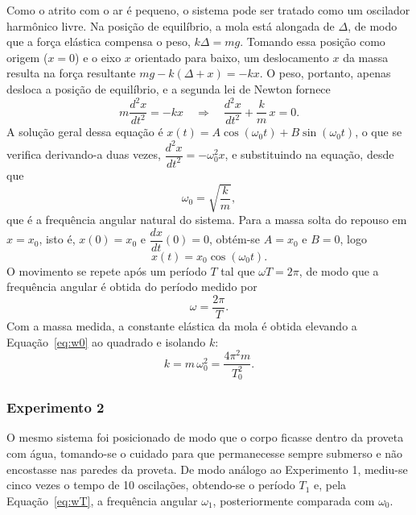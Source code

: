 \documentclass[12pt, a4paper]{article}
\begin{document}
Como o atrito com o ar é pequeno, o sistema pode ser tratado como um oscilador harmônico livre. Na posição de equilíbrio, a mola está alongada de $\Delta$, de modo que a força elástica compensa o peso, $k\Delta=mg$. Tomando essa posição como origem ($x=0$) e o eixo $x$ orientado para baixo, um deslocamento $x$ da massa resulta na força resultante $mg-k(\Delta+x)=-kx$. O peso, portanto, apenas desloca a posição de equilíbrio, e a segunda lei de Newton fornece
\[
m\frac{d^2x}{dt^2}=-kx
\quad\Longrightarrow\quad
\frac{d^2x}{dt^2}+\frac{k}{m}\,x=0.
\]
A solução geral dessa equação é $x(t)=A\cos(\omega_0 t)+B\sin(\omega_0 t)$, o que se verifica derivando-a duas vezes, $\dfrac{d^2x}{dt^2}=-\omega_0^2x$, e substituindo na equação, desde que
\begin{equation}
\omega_0=\sqrt{\frac{k}{m}},
\label{eq:w0}
\end{equation}
que é a frequência angular natural do sistema. Para a massa solta do repouso em $x=x_0$, isto é, $x(0)=x_0$ e $\dfrac{dx}{dt}(0)=0$, obtém-se $A=x_0$ e $B=0$, logo
\[
x(t)=x_0\cos(\omega_0 t).
\]
O movimento se repete após um período $T$ tal que $\omega T=2\pi$, de modo que a frequência angular é obtida do período medido por
\begin{equation}
\omega=\frac{2\pi}{T}.
\label{eq:wT}
\end{equation}
Com a massa medida, a constante elástica da mola é obtida elevando a Equação~\eqref{eq:w0} ao quadrado e isolando $k$:
\begin{equation}
k=m\,\omega_0^2=\frac{4\pi^2m}{T_0^2}.
\label{eq:k}
\end{equation}

\subsubsection{Experimento 2}

O mesmo sistema foi posicionado de modo que o corpo ficasse dentro da proveta com água, tomando-se o cuidado para que permanecesse sempre submerso e não encostasse nas paredes da proveta. De modo análogo ao Experimento 1, mediu-se cinco vezes o tempo de 10 oscilações, obtendo-se o período $T_1$ e, pela Equação~\eqref{eq:wT}, a frequência angular $\omega_1$, posteriormente comparada com $\omega_0$.
\end{document}
